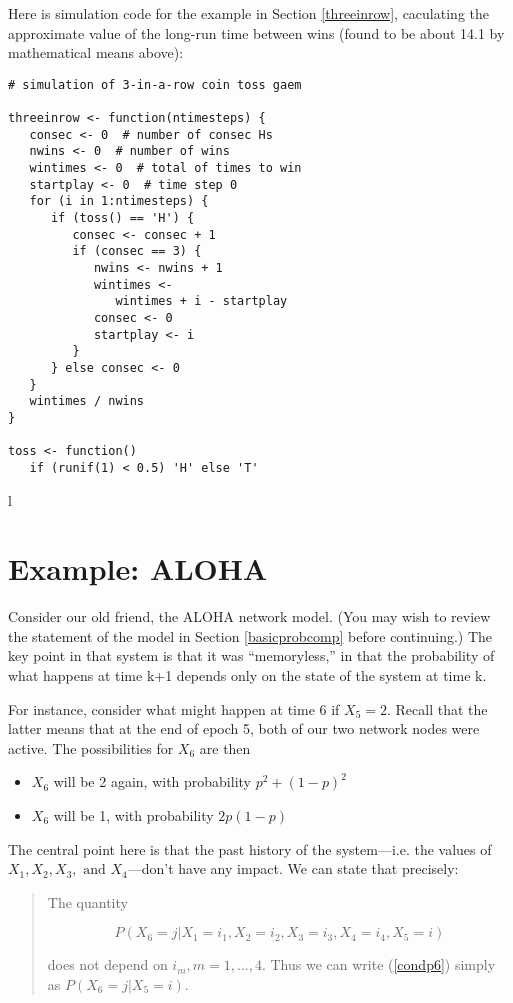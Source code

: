 Here is simulation code for the example in Section \ref{threeinrow},
caculating the approximate value of the long-run time between wins
(found to be about 14.1 by mathematical means above):

\begin{lstlisting}
# simulation of 3-in-a-row coin toss gaem

threeinrow <- function(ntimesteps) {
   consec <- 0  # number of consec Hs
   nwins <- 0  # number of wins
   wintimes <- 0  # total of times to win
   startplay <- 0  # time step 0
   for (i in 1:ntimesteps) {
      if (toss() == 'H') {
         consec <- consec + 1 
         if (consec == 3) {
            nwins <- nwins + 1
            wintimes <- 
               wintimes + i - startplay
            consec <- 0
            startplay <- i
         }
      } else consec <- 0
   }
   wintimes / nwins
}

toss <- function() 
   if (runif(1) < 0.5) 'H' else 'T'
\end{lstlisting}l

\section{Example:  ALOHA}

Consider our old friend, the ALOHA network model.  (You
may wish to review the statement of the model in Section
\ref{basicprobcomp} before continuing.)  The key point in that system is
that it was ``memoryless,'' in that the probability of what happens at
time k+1 depends only on the state of the system at time k.

For instance, consider what might happen at time 6 if $X_5 = 2$.  Recall
that the latter means that at the end of epoch 5, both of our two
network nodes were active.  The possibilities for $X_6$ are then

\begin{itemize}

\item $X_6$ will be 2 again, with probability $p^2 + (1-p)^2$

\item $X_6$ will be 1, with probability $2p(1-p)$

\end{itemize}

The central point here is that the past history of the system---i.e. the
values of $X_1, X_2, X_3, \textrm{ and } X_4$---don't have any impact.
We can state that precisely:

\begin{quote}

The quantity

\begin{equation}
\label{condp6}
P(X_6 = j | X_1 = i_1, X_2 = i_2, X_3 = i_3, X_4 = i_4, X_5 = i)
\end{equation}

\noindent 
does not depend on $i_m, m = 1,...,4$.  Thus we can write (\ref{condp6})
simply as $P(X_6 = j | X_5 = i)$.  

\end{quote}

